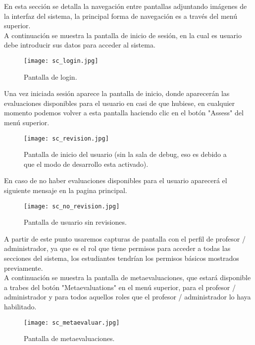 En esta sección se detalla la navegación entre pantallas adjuntando imágenes de la interfaz del sistema, la principal forma de navegación es a través del menú superior.\\

A continuación se muestra la pantalla de inicio de sesión, en la cual es usuario debe introducir sus datos para acceder al sistema.\\

\begin{figure}[h!]
	\centering
	\texttt{[image: sc\_login.jpg]}
	\caption{Pantalla de login.}
\end{figure}
\clearpage

Una vez iniciada sesión aparece la pantalla de inicio, donde aparecerán las evaluaciones disponibles para el usuario en casi de que hubiese, en cualquier momento podemos volver a esta pantalla haciendo clic en el botón "Assess" del menú superior.\\

\begin{figure}[h!]
	\centering
	\texttt{[image: sc\_revision.jpg]}
	\caption{Pantalla de inicio del usuario (sin la sala de debug, eso es debido a que el modo de desarrollo esta activado).}
\end{figure}
\clearpage

En caso de no haber evaluaciones disponibles para el usuario aparecerá el siguiente mensaje en la pagina principal.\\

\begin{figure}[h!]
	\centering
	\texttt{[image: sc\_no\_revision.jpg]}
	\caption{Pantalla de usuario sin revisiones.}
\end{figure}
\clearpage

A partir de este punto usaremos capturas de pantalla con el perfil de profesor / administrador, ya que es el rol que tiene permisos para acceder a todas las secciones del sistema, los estudiantes tendrían los permisos básicos mostrados previamente.\\

A continuación se muestra la pantalla de metaevaluaciones, que estará disponible a trabes del botón "Metaevaluations" en el menú superior, para el profesor / administrador y para todos aquellos roles que el profesor / administrador lo haya habilitado.\\

\begin{figure}[h!]
	\centering
	\texttt{[image: sc\_metaevaluar.jpg]}
	\caption{Pantalla de metaevaluaciones.}
\end{figure}
\clearpage

